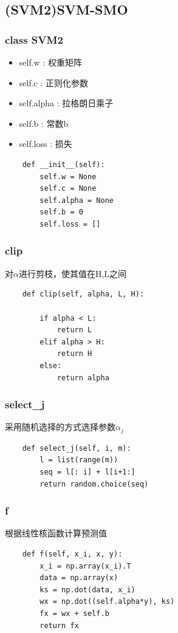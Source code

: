 \documentclass[12pt, a4paper, oneside]{ctexart}
\begin{document}
\subsection*{(SVM2)SVM-SMO}
\subsubsection*{class SVM2}
\begin{itemize}
    \item self.w : 权重矩阵
    \item self.c : 正则化参数
    \item self.alpha : 拉格朗日乘子
    \item self.b : 常数b
    \item self.loss : 损失
\end{itemize}
\begin{lstlisting}
    def __init__(self):
        self.w = None
        self.c = None
        self.alpha = None
        self.b = 0
        self.loss = []
\end{lstlisting}

\subsubsection*{clip}
对$\alpha$进行剪枝，使其值在H,L之间
\begin{lstlisting}
    def clip(self, alpha, L, H):
        
        if alpha < L:
            return L
        elif alpha > H:
            return H
        else:
            return alpha
\end{lstlisting}

\subsubsection*{select\_j}
采用随机选择的方式选择参数$\alpha_{j}$
\begin{lstlisting}
    def select_j(self, i, m):
        l = list(range(m))
        seq = l[: i] + l[i+1:]
        return random.choice(seq)
\end{lstlisting}
\subsubsection*{f}
根据线性核函数计算预测值
\begin{lstlisting}
    def f(self, x_i, x, y):
        x_i = np.array(x_i).T
        data = np.array(x)
        ks = np.dot(data, x_i)
        wx = np.dot((self.alpha*y), ks)
        fx = wx + self.b
        return fx
\end{lstlisting}
\end{document}
